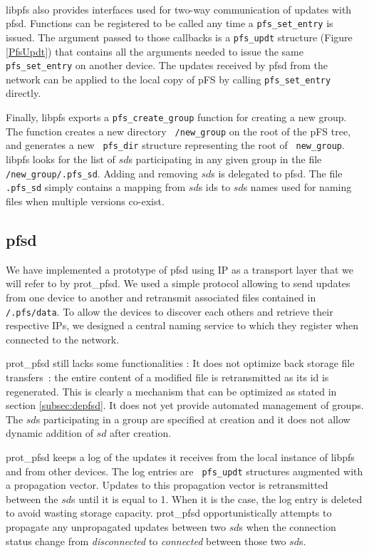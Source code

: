 \paragraph{}

libpfs also provides interfaces used for two-way communication of
updates with pfsd. Functions can be registered to be called any time a
{\tt pfs\_set\_entry} is issued. The argument passed to those
callbacks is a {\tt pfs\_updt} structure (Figure \ref{PfsUpdt}) that
contains all the arguments needed to issue the same {\tt
  pfs\_set\_entry} on another device. The updates received by pfsd
from the network can be applied to the local copy of pFS by calling
{\tt pfs\_set\_entry} directly.

Finally, libpfs exports a {\tt pfs\_create\_group} function for
creating a new group. The function creates a new directory {\tt
  /new\_group} on the root of the pFS tree, and generates a new {\tt
  pfs\_dir} structure representing the root of {\tt
  new\_group}. libpfs looks for the list of $sd$s participating in any
given group in the file {\tt /new\_group/.pfs\_sd}. Adding and
removing $sd$s is delegated to pfsd. The file {\tt .pfs\_sd} simply
contains a mapping from $sd$s ids to $sd$s names used for naming files
when multiple versions co-exist.

\subsection {pfsd}

We have implemented a prototype of pfsd using IP as a transport layer
that we will refer to by prot\_pfsd. We used a simple protocol allowing
to send updates from one device to another and retransmit associated
files contained in {\tt /.pfs/data}. To allow the devices to discover
each others and retrieve their respective IPs, we designed a central
naming service to which they register when connected to the network.

prot\_pfsd still lacks some functionalities : It does not optimize back
storage file transfers~: the entire content of a modified file is
retransmitted as its id is regenerated. This is clearly a mechanism
that can be optimized as stated in section \ref{subsec:depfsd}. It
does not yet provide automated management of groups. The $sd$s
participating in a group are specified at creation and it does
not allow dynamic addition of $sd$ after creation.

prot\_pfsd keeps a log of the updates it receives from the local
instance of libpfs and from other devices. The log entries are {\tt
  pfs\_updt} structures augmented with a propagation vector. Updates
to this propagation vector is retransmitted between the $sd$s until it
is equal to 1. When it is the case, the log entry is deleted to avoid
wasting storage capacity. prot\_pfsd opportunistically attempts to
propagate any unpropagated updates between two $sd$s when the
connection status change from \emph{disconnected} to \emph{connected}
between those two $sd$s.


